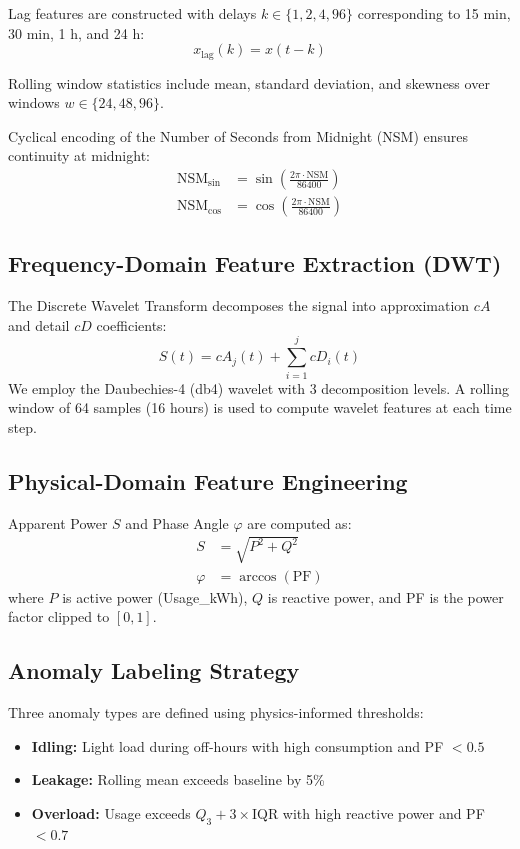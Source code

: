\documentclass[conference]{IEEEtran}
\begin{document}
Lag features are constructed with delays $k \in \{1, 2, 4, 96\}$ 
corresponding to 15 min, 30 min, 1 h, and 24 h:
\begin{equation}
x_{\text{lag}}(k) = x(t - k)
\label{eq:lag}
\end{equation}

Rolling window statistics include mean, standard deviation, 
and skewness over windows $w \in \{24, 48, 96\}$.

Cyclical encoding of the Number of Seconds from Midnight (NSM) 
ensures continuity at midnight:
\begin{align}
\text{NSM}_{\sin} &= \sin\left(\frac{2\pi \cdot \text{NSM}}{86400}\right) \\
\text{NSM}_{\cos} &= \cos\left(\frac{2\pi \cdot \text{NSM}}{86400}\right)
\end{align}

\subsection{Frequency-Domain Feature Extraction (DWT)}

The Discrete Wavelet Transform decomposes the signal into 
approximation $cA$ and detail $cD$ coefficients:
\begin{equation}
S(t) = cA_j(t) + \sum_{i=1}^{j} cD_i(t)
\label{eq:dwt}
\end{equation}
We employ the Daubechies-4 (db4) wavelet with 3 decomposition 
levels. A rolling window of 64 samples (16 hours) is used to 
compute wavelet features at each time step.

\subsection{Physical-Domain Feature Engineering}

Apparent Power $S$ and Phase Angle $\varphi$ are computed as:
\begin{align}
S &= \sqrt{P^2 + Q^2} \\
\varphi &= \arccos(\text{PF})
\end{align}
where $P$ is active power (Usage\_kWh), $Q$ is reactive power, 
and PF is the power factor clipped to $[0, 1]$.

\subsection{Anomaly Labeling Strategy}

Three anomaly types are defined using physics-informed thresholds:
\begin{itemize}
\item \textbf{Idling:} Light load during off-hours with high 
consumption and PF $< 0.5$
\item \textbf{Leakage:} Rolling mean exceeds baseline by 5\%
\item \textbf{Overload:} Usage exceeds $Q_3 + 3\times$IQR with 
high reactive power and PF $< 0.7$
\end{itemize}
\end{document}
